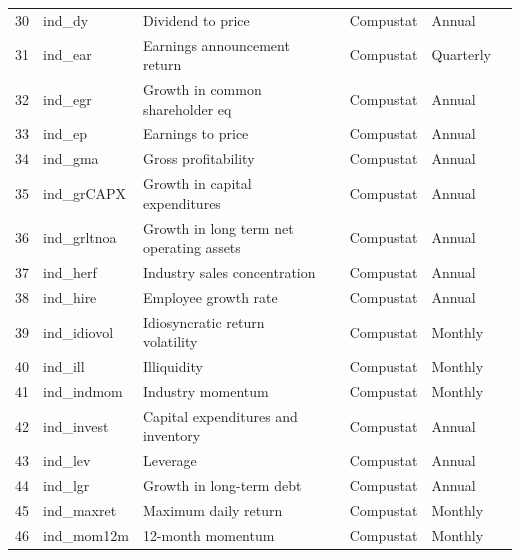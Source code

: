 \documentclass[a4paper, table]{article}
\begin{document}
\begin{landscape}
\begin{center}
\begin{longtable}{lllllll}
			30 & ind\_dy & Dividend to price & 
				\cite{litzenberger_effects_1982} & Compustat & Annual \\
			31 & ind\_ear & Earnings announcement return & 
				\cite{brandt_earnings_2008} & Compustat & Quarterly \\
			32 & ind\_egr & Growth in common shareholder eq & 
				\cite{richardson_accrual_2005} & Compustat & Annual \\
			33 & ind\_ep & Earnings to price & 
				\cite{basu_investment_1977} & Compustat & Annual \\
			34 & ind\_gma & Gross profitability & 
				\cite{novy-marx_other_2013} & Compustat & Annual \\
			35 & ind\_grCAPX\footnotemark[\value{footnote}] & Growth in capital expenditures & 
				\cite{anderson_empirical_2006} & Compustat & Annual \\
			36 & ind\_grltnoa\footnotemark[\value{footnote}] & Growth in long term net operating assets & 
				\cite{fairfield_accrued_2003} & Compustat & Annual \\
			37 & ind\_herf & Industry sales concentration & 
				\cite{hou_industry_2006} & Compustat & Annual \\
			38 & ind\_hire & Employee growth rate & 
				\cite{belo_labor_2014} & Compustat & Annual \\
			39 & ind\_idiovol & Idiosyncratic return volatility & 
				\cite{ali_arbitrage_2003} & Compustat & Monthly \\
			40 & ind\_ill & Illiquidity & 
				\cite{amihud_illiquidity_2002} & Compustat & Monthly \\
			41 & ind\_indmom & Industry momentum & 
				\cite{moskowitz_industries_1999} & Compustat & Monthly \\
			42 & ind\_invest\footnotemark[\value{footnote}] & Capital expenditures and inventory & 
				\cite{chen_better_2010} & Compustat & Annual \\
			43 & ind\_lev & Leverage & 
				\cite{bhandari_debt/equity_1988} & Compustat & Annual \\
			44 & ind\_lgr & Growth in long-term debt & 
				\cite{richardson_accrual_2005} & Compustat & Annual \\
			45 & ind\_maxret & Maximum daily return & 
				\cite{bali_maxing_2011} & Compustat & Monthly \\
			46 & ind\_mom12m & 12-month momentum & 
				\cite{jegadeesh_evidence_1990} & Compustat & Monthly \\

\end{longtable}
\end{center}
\end{landscape}
\end{document}
